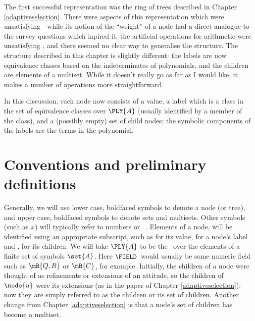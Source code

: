 The first successful representation was the ring of trees described in
Chapter \ref{adaptiveselection}.  There were aspects of this
representation which were unsatisfying---while its notion of the
``weight'' of a node had a direct analogue to the survey questions
which inpired it, the artificial operations for arithmetic were
unsatisfying , and there seemed no clear way to generalise the
structure. The structure described in this chapter is slightly
different: the labels are now equivalence classes based on the
indeterminates of polynomials, and the children are elements of a
multiset. While it doesn't really go as far as I would like, it makes
a number of operations more straightforward.

In this discussion, each node now consists of a value, a label which
is a class in the set of equivalence classes over $\PLY{A}$ (usually
identified by a member of the class), and a (possibly
empty) set of child nodes; the symbolic components of the labels are
the terms in the polynomial.

\section{Conventions and preliminary definitions}

Generally, we will use lower case, boldfaced symbols to denote a node
(or tree), and upper case, boldfaced symbols to denote sets and
multisets.  Other symbols (such as $x$) will typically refer to
numbers or \polyrat\ \polyforms. Elements of a node,  will be
identified using an appropriate subscript, such as  for its
value,  for a node's label and , for its
children. We will take $\PLY{A}$ to be the \polytypes\ over the
elements of a finite set of symbols $\set{A}$.  Here $\FIELD$\ would
usually be some numeric field such as $\mB{Q, R}$ or $\mB{C}$, for
example. Initially, the children of a node were thought of as
refinements or extensions of an attitude, so the children of
$\node{u}$ were its extensions (as in the paper of Chapter
\ref{adaptiveselection}); now they are simply referred to as the
children or its set of children.  Another change from Chapter
\ref{adaptiveselection} is that a node's set of children has become a
multiset.

